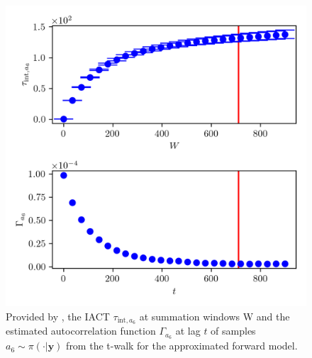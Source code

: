 \begin{figure}[ht!]
	\centering
	\includegraphics{UwerrTauIntTWalk17.png}
	\caption[IACT and autocorrelation function of samples $a_6 \sim \pi(\cdot|\bm{y})$, for approximated model.]{Provided by \cite{drikHesse}, the IACT $\tau_{\text{int},a_6}$ at summation windows W and the estimated autocorrelation function $\Gamma_{a_6}$ at lag $t$ of samples $a_6 \sim \pi( \cdot| \bm{y})$ from the t-walk for the approximated forward model.}
	\label{fig:TWalkIATC18}
\end{figure}





